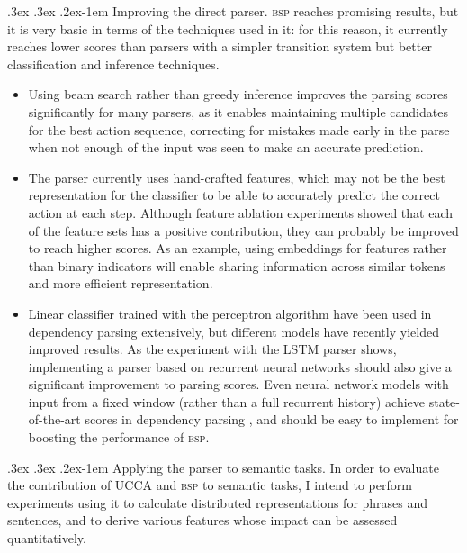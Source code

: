 \documentclass[11pt]{article}
\makeatletter
\renewcommand{\paragraph}{
  \@startsection{paragraph}{4}
  {\z@}{.3ex \@plus .3ex \@minus .2ex}{-1em}
  {\normalfont\normalsize\bfseries}
}
\makeatother
\begin{document}
\paragraph{Improving the direct parser.}
\textsc{bsp} reaches promising results, but it is very basic in terms of the
techniques used in it: for this reason, it currently reaches lower scores than parsers
with a simpler transition system but better classification and inference techniques.
\begin{itemize}
\item Using beam search rather than greedy inference improves the parsing
scores significantly for many parsers, as it enables maintaining multiple candidates
for the best action sequence, correcting for mistakes made early in the parse when
not enough of the input was seen to make an accurate prediction.
\item The parser currently uses hand-crafted features, which may not be the best
representation for the classifier to be able to accurately predict the correct action
at each step. Although feature ablation experiments showed that each of the feature
sets has a positive contribution, they can probably be improved to reach higher scores.
As an example, using embeddings for features rather than binary
indicators will enable sharing information across similar tokens and more efficient
representation.
\item Linear classifier trained with the perceptron algorithm have been used in
dependency parsing extensively, but different models have recently yielded improved
results.
As the experiment with the LSTM parser shows, implementing a parser
based on recurrent neural networks should also give a significant improvement to
parsing scores.
Even neural network models with input from a fixed window (rather than a full recurrent
history) achieve state-of-the-art scores in dependency parsing
\cite{chen2014fast,andor2016globally}, and should be easy to implement for boosting
the performance of \textsc{bsp}.
\end{itemize}

\paragraph{Applying the parser to semantic tasks.}
In order to evaluate the contribution of UCCA and \textsc{bsp} to semantic tasks,
I intend to perform experiments using it to calculate distributed representations for
phrases and sentences, and to derive various features whose impact can be assessed quantitatively.





\end{document}
